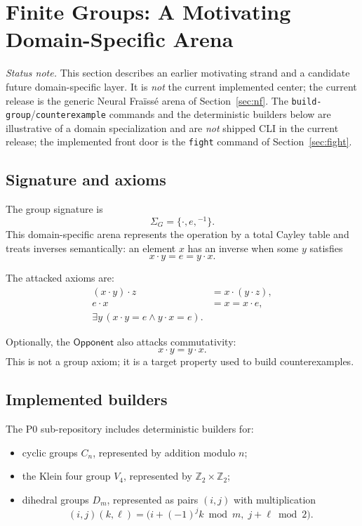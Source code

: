 \documentclass[11pt]{article}
\newcommand{\Opponent}{\ensuremath{\mathsf{Opponent}}}
\begin{document}
\section{Finite Groups: A Motivating Domain-Specific Arena}\label{sec:groups}

\emph{Status note.}  This section describes an earlier motivating strand and a candidate future domain-specific layer.  It is \emph{not} the current implemented center; the current release is the generic Neural Fra\"iss\'e arena of Section~\ref{sec:nf}.  The \texttt{build-group}/\texttt{counterexample} commands and the deterministic builders below are illustrative of a domain specialization and are \emph{not} shipped CLI in the current release; the implemented front door is the \texttt{fight} command of Section~\ref{sec:fight}.

\subsection{Signature and axioms}

The group signature is
\[
  \Sigma_G = \{\cdot,e,{}^{-1}\}.
\]
This domain-specific arena represents the operation by a total Cayley table and treats inverses semantically: an element \(x\) has an inverse when some \(y\) satisfies
\[
  x\cdot y = e = y\cdot x.
\]

The attacked axioms are:
\begin{align*}
  (x\cdot y)\cdot z &= x\cdot (y\cdot z), \\
  e\cdot x &= x = x\cdot e, \\
  \exists y\,(x\cdot y=e \wedge y\cdot x=e).
\end{align*}

Optionally, the \Opponent{} also attacks commutativity:
\[
  x\cdot y = y\cdot x.
\]
This is not a group axiom; it is a target property used to build counterexamples.

\subsection{Implemented builders}

The P0 sub-repository includes deterministic builders for:
\begin{itemize}[leftmargin=2em]
  \item cyclic groups \(C_n\), represented by addition modulo \(n\);
  \item the Klein four group \(V_4\), represented by \(\mathbb{Z}_2\times\mathbb{Z}_2\);
  \item dihedral groups \(D_m\), represented as pairs \((i,j)\) with multiplication
  \[
    (i,j)(k,\ell)=\bigl(i+(-1)^j k \bmod m,\; j+\ell \bmod 2\bigr).
  \]
\end{itemize}
\end{document}
